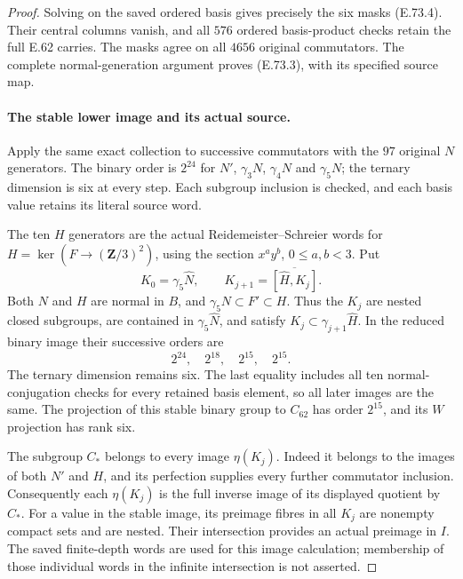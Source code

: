 \begin{proof}
Solving on the saved ordered basis gives precisely the six
masks (E.73.4). Their central columns vanish, and all $576$
ordered basis-product checks retain the full E.62 carries.
The masks agree on all $4656$ original commutators. The
complete normal-generation argument proves (E.73.3), with
its specified source map.

\paragraph{The stable lower image and its actual source.}
Apply the same exact collection to successive commutators
with the $97$ original $N$ generators. The binary order is
$2^{24}$ for $N'$, $\gamma_3N$, $\gamma_4N$ and
$\gamma_5N$; the ternary dimension is six at every step.
Each subgroup inclusion is checked, and each basis value
retains its literal source word.

The ten $H$ generators are the actual Reidemeister--Schreier
words for $H=\ker(F\to(\mathbf Z/3)^2)$, using the section
$x^ay^b$, $0\leq a,b<3$. Put
\[
 K_0=\gamma_5\widehat N,\qquad
 K_{j+1}=\overline{[\widehat H,K_j]}.
 \tag{E.73.10}
\]
Both $N$ and $H$ are normal in $B$, and
$\gamma_5N\subset F'\subset H$. Thus the $K_j$ are nested
closed subgroups, are contained in $\gamma_5\widehat N$,
and satisfy $K_j\subset\gamma_{j+1}\widehat H$.
In the reduced binary image their successive orders are
\[
              2^{24},\quad2^{18},\quad2^{15},\quad2^{15}.
 \tag{E.73.11}
\]
The ternary dimension remains six. The last equality
includes all ten normal-conjugation checks for every
retained basis element, so all later images are the same.
The projection of this stable binary group to $C_{62}$
has order $2^{15}$, and its $W$ projection has rank six.

The subgroup $C_*$ belongs to every image $\eta(K_j)$.
Indeed it belongs to the images of both $N'$ and $H$,
and its perfection supplies every further commutator
inclusion. Consequently each $\eta(K_j)$ is the full
inverse image of its displayed quotient by $C_*$.
For a value in the stable image, its preimage fibres
in all $K_j$ are nonempty compact sets and are nested.
Their intersection provides an actual preimage in
$I$. The saved finite-depth words are used for this
image calculation; membership of those individual
words in the infinite intersection is not asserted.


\end{proof}
